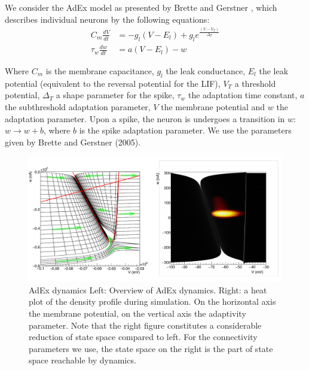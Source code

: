 \documentclass[10pt]{article}
\begin{document}
We consider the AdEx model as presented by Brette and Gerstner \cite{brette2005adaptive}, which describes individual neurons by the following equations:
\begin{align}
  C_m \frac{dV}{dt}    & =  -g_l(V - E_l)  + g_l e^{ \frac{(V - V_T)}{\Delta_{T}}} \\
  \tau_w \frac{dw}{dt} & =  a(V-E_l) -w \nonumber
\end{align}

Where $C_m$ is the membrane capacitance, $g_l$ the leak conductance, $E_l$ the leak potential (equivalent to the reversal potential for the LIF), $V_T$ a threshold potential, $\Delta_T$ a shape parameter for the spike, $\tau_w$ the adaptation time constant, $a$ the subthreshold adaptation parameter,  $V$ the membrane potential and $w$ the adaptation parameter. Upon a spike, the neuron is undergoes a transition in $w$: $w \rightarrow w +b$, where $b$ is the spike adaptation parameter.
We use the parameters given by Brette and Gerstner (2005).


\begin{figure}[h!]
  \begin{center}
    \includegraphics[width=1.0\columnwidth]{figures/aexp_overview.pdf}
    \caption{{AdEx dynamics {\label{fig-adex}} Left: Overview of AdEx dynamics.
        Right: a heat plot of the density profile during simulation. On the horizontal axis the membrane potential, on the vertical axis the adaptivity parameter. Note that
 the right figure constitutes a considerable reduction of state space compared to left. For the connectivity parameters we use, the state space on the right is the
part of state space reachable by dynamics.
      }}
  \end{center}
\end{figure}
\end{document}
